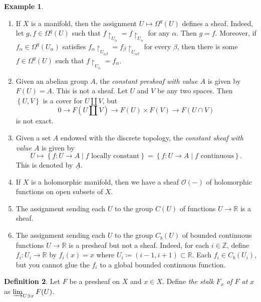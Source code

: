 \documentclass[10pt,letterpaper,cm]{nupset}
\theoremstyle{definition}
\newtheorem{definition}{Definition}[subsection]
\newtheorem{exmp}[definition]{Example}
\theoremstyle{theorem}
\theoremstyle{remark}
\newcommand{\R}{\mathbb{R}}
\newcommand{\Z}{\mathbb Z}
\newcommand{\1}{\mathbb{1}}
\newcommand{\0}{\vec 0}
\begin{document}
\begin{exmp} $ $
\begin{enumerate}
\item If $X$ is a manifold, then the assignment $U \mapsto \Omega^q(U)$ defines a sheaf. Indeed, let $g,f \in \Omega^q(U)$ such that $f \restriction_{U_{\alpha}} = f \restriction_{U_{\alpha}}$ for any $\alpha$. Then $g=f$. Moreover, if $f_{\alpha}\in \Omega^q(U_{\alpha})$ satisfies $f_{\alpha}\restriction_{U_{\alpha \beta}} = f_{\beta} \restriction_{U_{\alpha \beta}}$ for every $\beta$, then there is some $f \in \Omega^q(U)$ such that $f \restriction_{U_{\alpha}} = f_{\alpha}$.
\item Given an  abelian group $A$, the \textit{constant presheaf with value $A$} is given by $F(U) = A$. This is not a sheaf. Let $U$ and $V$ be any two spaces. Then $\left\{U, V\right\}$ is a cover for $U \coprod V$, but $$0 \to F\left(U \coprod V\right) \to F(U) \times F(V) \to F\left(U \cap V\right)$$ is not exact.
\item Given a set $A$ endowed with the discrete topology, the \textit{constant sheaf with value $A$}  is given by $$U \mapsto \left\{ f : U \to A \mid f \text{ locally constant}\right\} =   \left\{ f : U \to A \mid f \text{ continuous}\right\}.$$ This is denoted by  $\underline{A}$.
\item If $X$ is a holomorphic manifold, then we have a sheaf $\mathcal{O}({-})$ of holomorphic functions on open subsets of $X$.
\item The assignment sending each $U$ to the group $C(U)$ of functions $U \to \R$ is a sheaf.
\item  The assignment sending each $U$ to the group $C_b(U)$ of bounded continuous functions $U \to \R$ is a presheaf but not a sheaf. Indeed, for each $i\in \Z$, define $f_i : U_i \to \R$ by $f_i(x) = x$ where $U_i \coloneqq \left(i-1, i+1\right)\subset \R$. Each $f_i \in C_b(U_i)$, but you cannot glue the $f_i$ to a global bounded continuous function.  
\end{enumerate}
\end{exmp}

\begin{definition} 
Let $F$ be a presheaf on $X$ and $x\in X$. Define \textit{the stalk $F_x$ of $F$ at $x$} as $\varinjlim_{U \ni x}F(U)$.
\end{definition}
\end{document}
